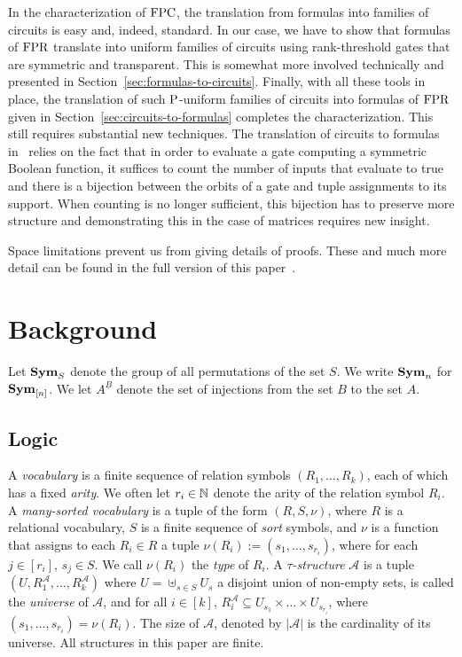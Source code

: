 \documentclass[a4paper,UKenglish]{lipics-v2018}
\begin{document}
In the characterization of $\text{\upshape FPC}$, the translation from formulas into families
of circuits is easy and, indeed, standard. In our case, we have to show that
formulas of $\text{\upshape FPR}$ translate into uniform families of circuits using
rank-threshold gates that are symmetric and transparent. This is somewhat more
involved technically and presented in Section~\ref{sec:formulas-to-circuits}.
Finally, with all these tools in place, the translation of such $\mathrm{P}$-uniform
families of circuits into formulas of $\text{\upshape FPR}$ given in
Section~\ref{sec:circuits-to-formulas} completes the characterization. This
still requires substantial new techniques. The translation of circuits to
formulas in~\cite{AndersonD17} relies on the fact that in order to evaluate a
gate computing a symmetric Boolean function, it suffices to count the number of
inputs that evaluate to true and there is a bijection between the orbits of a
gate and tuple assignments to its support. When counting is no longer
sufficient, this bijection has to preserve more structure and demonstrating this
in the case of matrices requires new insight.

Space limitations prevent us from giving details of proofs. These and much more
detail can be found in the full version of this paper~\cite{DW-arxiv}.


\section{Background}\label{sec:background}
Let $\text{\textbf{Sym}}_S$ denote the group of all permutations of the set $S$. We write
$\text{\textbf{Sym}}_n$ for $\text{\textbf{Sym}}_{[n]}$. We let $A^{\underline{B}}$ denote the set of
injections from the set $B$ to the set $A$.

\subsection{Logic}
A \emph{vocabulary} is a finite sequence of relation symbols $(R_1, \ldots,
R_k)$, each of which has a fixed \emph{arity}. We often let $r_i \in \mathbb{N}$
denote the arity of the relation symbol $R_i$. A \emph{many-sorted vocabulary}
is a tuple of the form $(R, S, \nu)$, where $R$ is a relational vocabulary, $S$
is a finite sequence of \emph{sort} symbols, and $\nu$ is a function that
assigns to each $R_i \in R$ a tuple $\nu(R_i) := (s_1, \ldots, s_{r_i})$, where
for each $j \in [r_i]$, $s_j \in S$. We call $\nu(R_i)$ the \emph{type} of
$R_i$. A \emph{$\tau$-structure} $\mathcal{A}$ is a tuple $(U ,
R^{\mathcal{A}}_1 , \ldots , R^{\mathcal{A}}_k)$ where $U = \uplus_{s \in S }
U_{s}$ a disjoint union of non-empty sets, is called the \emph{universe} of
$\mathcal{A}$, and for all $i \in [k]$, $R^{\mathcal{A}}_i \subseteq U_{s_1} \times \ldots \times U_{s_{r_i}}$, where
$(s_1 , \ldots , s_{r_i}) = \nu (R_i)$. The size of $\mathcal{A}$, denoted by
$\vert \mathcal{A} \vert$ is the cardinality of its universe. All structures in
this paper are finite.
\end{document}
